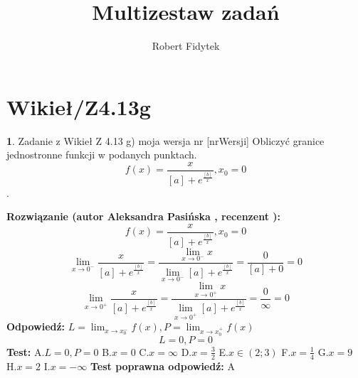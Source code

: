 \documentclass[12pt, a4paper]{article}
\title{Multizestaw zadań}
\author{Robert Fidytek}
\date{}
\theoremstyle{definition} %
\newtheorem{zad}{}
\newcommand{\kategoria}[1]{\section{#1}} %
\newcommand{\zadStart}[1]{\begin{zad}#1\newline} %
\newcommand{\zadStop}{\end{zad}}   %
\newcommand{\rozwStart}[2]{\noindent \textbf{Rozwiązanie (autor #1 , recenzent #2): }\newline} %
\newcommand{\rozwStop}{\newline}                                            %
\newcommand{\odpStart}{\noindent \textbf{Odpowiedź:}\newline}    %
\newcommand{\odpStop}{\newline}                                             %
\newcommand{\testStart}{\noindent \textbf{Test:}\newline} %
\newcommand{\testStop}{\newline} %
\newcommand{\kluczStart}{\noindent \textbf{Test poprawna odpowiedź:}\newline} %
\newcommand{\kluczStop}{\newline} %
\begin{document}
\maketitle


\kategoria{Wikieł/Z4.13g}
\zadStart{Zadanie z Wikieł Z 4.13 g) moja wersja nr [nrWersji]}
Obliczyć granice jednostronne funkcji w podanych punktach. $$f(x)=\frac{x}{[a]+e^{\frac{[b]}{x}}},x_{0}=0$$.
\zadStop
\rozwStart{Aleksandra Pasińska}{}
$$f(x)=\frac{x}{[a]+e^{\frac{[b]}{x}}},x_{0}=0$$
$$\lim_{x\rightarrow 0^-}\frac{x}{[a]+e^{\frac{[b]}{x}}}=\frac{\lim_{x\rightarrow 0^-}x}{\lim_{x\rightarrow 0^-}[a]+e^{\frac{[b]}{x}}}=\frac{0}{[a]+0}=0$$ 
$$\lim_{x\rightarrow 0^+}\frac{x}{[a]+e^{\frac{[b]}{x}}}=\frac{\lim_{x\rightarrow 0^+}x}{\lim_{x\rightarrow 0^+}[a]+e^{\frac{[b]}{x}}}=\frac{0}{\infty}=0$$ 
\rozwStop
\odpStart
$ L=\lim_{x\rightarrow x_{0}^-}f(x), P=\lim_{x\rightarrow x_{0}^+}f(x)$
$$L=0, P=0$$
\odpStop
\testStart
A.$ L=0, P=0 $
B.$x=0$
C.$x=\infty$
D.$x=\frac{3}{2}$
E.$x\in (2;3)$
F.$x=\frac{1}{4}$
G.$x=9$
H.$x=2$
I.$x=-\infty$
\testStop
\kluczStart
A
\kluczStop
\end{document}
